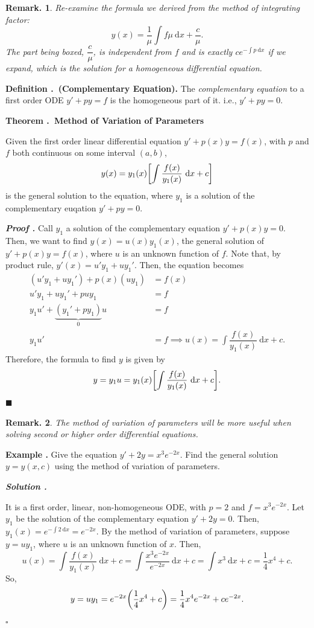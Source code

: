 \documentclass[12pt, a4paper]{article}
\newcounter{index}[subsection]
\newenvironment*{df}[1]{\par\noindent\textbf{Definition \thesubsection.\stepcounter{index}\theindex\ (#1).}}{\par}
\newenvironment*{eg}{\begin{framed}\par\noindent\textbf{Example \thesubsection.\stepcounter{index}\theindex}}{\par\end{framed}}
\newenvironment*{thm}[1]{\begin{tcolorbox}\par\noindent\textbf{Theorem \thesubsection.\stepcounter{index}\theindex\ #1} \par}{\par\end{tcolorbox}}
\newcounter{nprf}[subsection]
\newenvironment*{prf}{\par\indent\textbf{\textit{Proof \stepcounter{nprf}\thenprf.}}}{\hfill$\blacksquare$\par}
\newenvironment*{sol}{\par\indent\textbf{\textit{Solution \stepcounter{nprf}\thenprf.}}\par}{\hfill{$\square$}\par}
\newtheorem*{rmk}{Remark.}
\def\d{{\mathrm{d}}}
\begin{document}
\begin{rmk}
	Re-examine the formula we derived from the method of integrating factor: \[y(x)=\dfrac{1}{\mu}\int f\mu\ \d x+\boxed{\dfrac{c}{\mu}}.\] The part being boxed, $\dfrac{c}{\mu}$, is independent from $f$ and is exactly $ce^{-\int p\ \d x}$ if we expand, which is the solution for a homogeneous differential equation. 
\end{rmk}
\begin{df}{Complementary Equation}
	The \textit{complementary equation} to a first order ODE $y'+py=f$ is the homogeneous part of it. i.e., $y'+py=0$.	
\end{df}
\begin{thm}{Method of Variation of Parameters}
	Given the first order linear differential equation $y'+p(x)y=f(x)$, with $p$ and $f$ both continuous on some interval $(a,b)$, \[y(x)=y_1(x)\qty[\int\dfrac{f(x)}{y_1(x)}\ \d x+c]\] is the general solution to the equation, where $y_1$ is a solution of the complementary euqation $y'+py=0$.
\end{thm}
\begin{prf}
	Call $y_1$ a solution of the complementary equation $y'+p(x)y=0$. Then, we want to find $y(x)=u(x)y_1(x)$, the general solution of $y'+p(x)y=f(x)$, where $u$ is an unknown function of $f$. Note that, by product rule, $y'(x)=u'y_1+uy_1'$. Then, the equation becomes \[\begin{aligned}(u'y_1+uy_1')+p(x)(uy_1)&=f(x)\\u'y_1+uy_1'+puy_1&=f\\y_1u'+\underbrace{(y_1'+py_1)}_{0}u&=f\\y_1u'&=f\implies u(x)=\int\dfrac{f(x)}{y_1(x)}\ \d x+c.\end{aligned}\] Therefore, the formula to find $y$ is given by \[y=y_1u=y_1(x)\qty[\int\dfrac{f(x)}{y_1(x)}\ \d{x}+c].\]
\end{prf}
\begin{rmk}
	The method of variation of parameters will be more useful when solving second or higher order differential equations.	
\end{rmk}
\begin{eg}
	Give the equation $y'+2y=x^3e^{-2x}$. Find the general solution $y=y(x,c)$ using the method of variation of parameters.
	\begin{sol}
		It is a first order, linear, non-homogeneous ODE, with $p=2$ and $f=x^3e^{-2x}$. Let $y_1$ be the solution of the complementary equation $y'+2y=0$. Then, $y_1(x)=e^{-\int2\ \d{x}}=e^{-2x}$. By the method of variation of parameters, suppose $y=uy_1$, where $u$ is an unknown function of $x$. Then, \[u(x)=\int\dfrac{f(x)}{y_1(x)}\ \d{x}+c=\int\dfrac{x^3e^{-2x}}{e^{-2x}}\ \d{x}+c=\int x^3\ \d{x}+c=\dfrac{1}{4}x^4+c.\] So, \[y=uy_1=e^{-2x}\qty(\dfrac{1}{4}x^4+c)=\dfrac{1}{4}x^4e^{-2x}+ce^{-2x}.\]
	\end{sol}
\end{eg}
\end{document}
